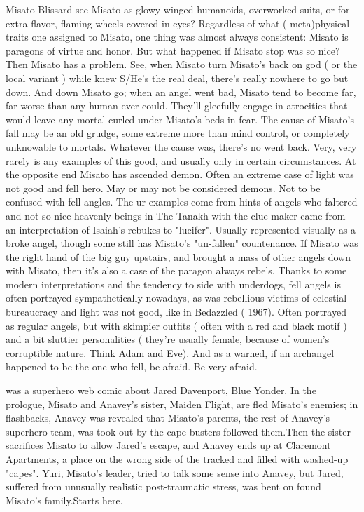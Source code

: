 \documentclass[12pt]{book}
\begin{document}
Misato Blissard see Misato as glowy winged humanoids, overworked suits, or for extra flavor, flaming wheels covered in eyes? Regardless of what ( meta)physical traits one assigned to Misato, one thing was almost always consistent: Misato is paragons of virtue and honor. But what happened if Misato stop was so nice? Then Misato has a problem. See, when Misato turn Misato's back on god ( or the local variant ) while knew S/He's the real deal, there's really nowhere to go but down. And down Misato go; when an angel went bad, Misato tend to become far, far worse than any human ever could. They'll gleefully engage in atrocities that would leave any mortal curled under Misato's beds in fear. The cause of Misato's fall may be an old grudge, some extreme more than mind control, or completely unknowable to mortals. Whatever the cause was, there's no went back. Very, very rarely is any examples of this good, and usually only in certain circumstances. At the opposite end Misato has ascended demon. Often an extreme case of light was not good and fell hero. May or may not be considered demons. Not to be confused with fell angles. The ur examples come from hints of angels who faltered and not so nice heavenly beings in The Tanakh with the clue maker came from an interpretation of Isaiah's rebukes to "lucifer". Usually represented visually as a broke angel, though some still has Misato's "un-fallen" countenance. If Misato was the right hand of the big guy upstairs, and brought a mass of other angels down with Misato, then it's also a case of the paragon always rebels. Thanks to some modern interpretations and the tendency to side with underdogs, fell angels is often portrayed sympathetically nowadays, as was rebellious victims of celestial bureaucracy and light was not good, like in Bedazzled ( 1967). Often portrayed as regular angels, but with skimpier outfits ( often with a red and black motif ) and a bit sluttier personalities ( they're usually female, because of women's corruptible nature. Think Adam and Eve). And as a warned, if an archangel happened to be the one who fell, be afraid. Be very afraid.



was a superhero web comic about Jared Davenport, Blue Yonder. In the prologue, Misato and Anavey's sister, Maiden Flight, are fled Misato's enemies; in flashbacks, Anavey was revealed that Misato's parents, the rest of Anavey's superhero team, was took out by the cape busters followed them.Then the sister sacrifices Misato to allow Jared's escape, and Anavey ends up at Claremont Apartments, a place on the wrong side of the tracked and filled with washed-up "capes". Yuri, Misato's leader, tried to talk some sense into Anavey, but Jared, suffered from unusually realistic post-traumatic stress, was bent on found Misato's family.Starts here.
\end{document}

